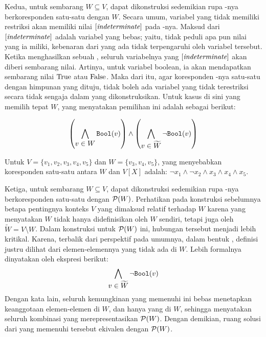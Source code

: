 Kedua, untuk sembarang \(W \subseteq V\), dapat dikonstruksi  sedemikian rupa -nya berkoresponden satu-satu dengan \(W\). Secara umum, variabel yang tidak memiliki restriksi akan memiliki nilai \(\mathit{[indeterminate]}\) pada -nya. Maksud dari \(\mathit{[indeterminate]}\) adalah variabel yang bebas; yaitu, tidak peduli apa pun nilai yang ia miliki, kebenaran dari  yang ada tidak terpengaruhi oleh variabel tersebut. Ketika  menghasilkan sebuah , seluruh variabelnya yang \(\mathit{[indeterminate]}\) akan diberi sembarang nilai. Artinya, untuk variabel boolean, ia akan mendapatkan sembarang nilai \(\mathrm{True}\) atau \(\mathrm{False}\). Maka dari itu, agar koresponden -nya satu-satu dengan himpunan yang dituju, tidak boleh ada variabel yang tidak terestriksi secara tidak sengaja dalam  yang dikonstruksikan. Untuk kasus di sini yang memilih tepat \(W\),  yang menyatakan pemilihan ini adalah sebagai berikut:

\[
	\combine{\left(}
			{\bigwedge \limits_{\displaystyle v \in W} \boolmap(v)}
	{\right)}{\wedge}{\left(}
			{\bigwedge \limits_{\displaystyle v \in \widetilde{W}} \neg \boolmap(v)}
	{\right)}
\]

\begin{example}
	Untuk \(V = \{v_1, v_2, v_3, v_4, v_5\}\) dan \(W = \{v_3, v_4, v_5\}\),  yang menyebabkan koresponden satu-satu antara \(W\) dan \(V[X]\) adalah: \(\neg x_1 \wedge \neg x_2 \wedge x_3 \wedge x_4 \wedge x_5\).
\end{example}

Ketiga, untuk sembarang \(W \subseteq V\), dapat dikonstruksi  sedemikian rupa -nya berkoresponden satu-satu dengan \(\mathcal{P}(W)\). Perhatikan pada konstruksi  sebelumnya betapa pentingnya konteks \(V\) yang dimaksud relatif terhadap \(W\) karena  yang menyatakan \(W\) tidak hanya didefinisikan oleh \(W\) sendiri, tetapi juga oleh \(\widetilde{W} = V \setminus W\). Dalam konstruksi  untuk \(\mathcal{P}(W)\) ini, hubungan tersebut menjadi lebih kritikal. Karena, terbalik dari perspektif  pada umumnya, dalam bentuk , definisi  justru dilihat dari elemen-elemennya yang tidak ada di \(W\). Lebih formalnya dinyatakan oleh ekspresi berikut:
\[
	\bigwedge \limits_{\displaystyle v \in \widetilde{W}} \neg \mathtt{Bool}(v)
\]
Dengan kata lain, seluruh kemungkinan  yang memenuhi  ini bebas menetapkan keanggotaan elemen-elemen di \(W\), dan hanya yang di \(W\), sehingga menyatakan seluruh kombinasi yang merepresentasikan \(\mathcal{P}(W)\). Dengan demikian, ruang solusi dari  yang memenuhi  tersebut ekivalen dengan \(\mathcal{P}(W)\).

